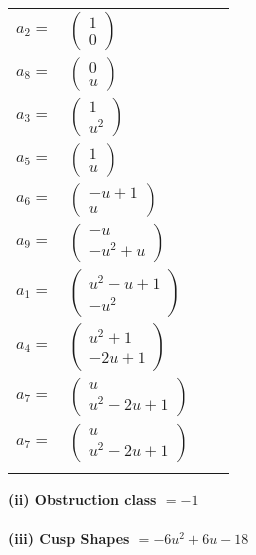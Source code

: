 \documentclass[1p]{elsarticle_modified}
\theoremstyle{definition}
\begin{document}
\begin{tabular}{m{7pt} m{180pt} m{7pt} m{180pt} }
\flushright $a_{2}=$&$\begin{pmatrix}1\\0\end{pmatrix}$ \\
\flushright $a_{8}=$&$\begin{pmatrix}0\\u\end{pmatrix}$ \\
\flushright $a_{3}=$&$\begin{pmatrix}1\\u^2\end{pmatrix}$ \\
\flushright $a_{5}=$&$\begin{pmatrix}1\\u\end{pmatrix}$ \\
\flushright $a_{6}=$&$\begin{pmatrix}- u+1\\u\end{pmatrix}$ \\
\flushright $a_{9}=$&$\begin{pmatrix}- u\\- u^2+u\end{pmatrix}$ \\
\flushright $a_{1}=$&$\begin{pmatrix}u^2- u+1\\- u^2\end{pmatrix}$ \\
\flushright $a_{4}=$&$\begin{pmatrix}u^2+1\\-2 u+1\end{pmatrix}$ \\
\flushright $a_{7}=$&$\begin{pmatrix}u\\u^2-2 u+1\end{pmatrix}$\\ \flushright $a_{7}=$&$\begin{pmatrix}u\\u^2-2 u+1\end{pmatrix}$\\&\end{tabular}
\flushleft \textbf{(ii) Obstruction class $= -1$}\\~\\
\flushleft \textbf{(iii) Cusp Shapes $= -6 u^2+6 u-18$}\\~\\
\end{document}

